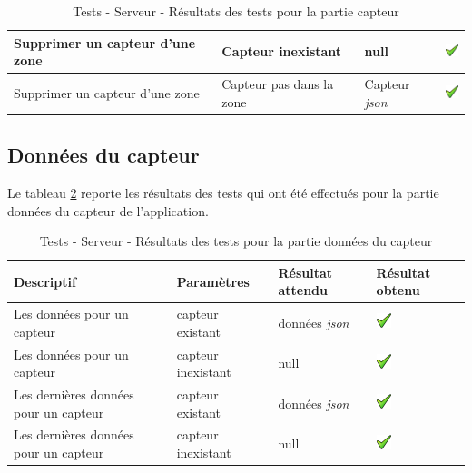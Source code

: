 \begin{table}[H]
\begin{tabularx}{\textwidth}{|X|X|X|X|}
  \hline
  Supprimer un capteur d'une zone & Capteur inexistant & null & \includegraphics[width=16px]{00_media/ok.png} \\
  \hline
  Supprimer un capteur d'une zone & Capteur pas dans la zone & Capteur \emph{\gls{json}} & \includegraphics[width=16px]{00_media/ok.png} \\
  \hline
\end{tabularx}
\caption{Tests - Serveur - Résultats des tests pour la partie capteur}
\label{tab:stestSensor}
\end{table}

\clearpage

\subsection{Données du capteur} %
\label{sub:login}
Le tableau \ref{tab:stestData} reporte les résultats des tests qui ont été effectués pour la partie données du capteur de l'application.
\begin{table}[H]
\begin{tabularx}{\textwidth}{|X|X|X|X|}
  \hline
  \bf{Descriptif} & \bf{Paramètres} & \bf{Résultat attendu} & \bf{Résultat obtenu}\\
  \hline
  Les données pour un capteur & capteur existant & données \emph{\gls{json}} & \includegraphics[width=16px]{00_media/ok.png} \\
  \hline
  Les données pour un capteur & capteur inexistant & null & \includegraphics[width=16px]{00_media/ok.png} \\
  \hline
  Les dernières données pour un capteur & capteur existant & données \emph{\gls{json}} & \includegraphics[width=16px]{00_media/ok.png} \\
  \hline
  Les dernières données pour un capteur & capteur inexistant & null & \includegraphics[width=16px]{00_media/ok.png} \\
  \hline
\end{tabularx}
\caption{Tests - Serveur - Résultats des tests pour la partie données du capteur}
\label{tab:stestData}
\end{table}